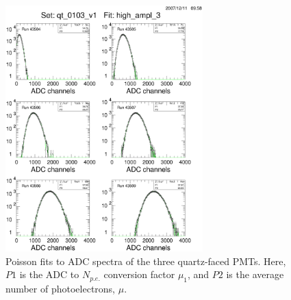 \begin{figure}
\begin{centering}
\includegraphics[height=9.5cm]{PMT-studies/qt_0103_v1_fits.eps}
\vspace{0.5cm}
\caption{\small{Poisson fits to ADC spectra of the three quartz-faced 
PMTs.  Here, $P1$ is the ADC to $N_{p.e.}$ conversion factor $\mu_1$, 
and $P2$ is the average number of photoelectrons, $\mu$.}}
\label{poisson_quartz}
\end{centering}
\end{figure}

